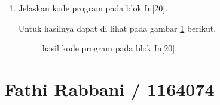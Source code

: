 \begin{enumerate}
\item Jelaskan kode program pada blok  In[20].

Untuk hasilnya dapat di lihat pada gambar \ref{c160} berikut.
\begin{figure}[!htbp]
      \caption{hasil kode program pada blok  In[20].}
      \label{c160}
      \end{figure}

\end{enumerate}


\section{Fathi Rabbani / 1164074}
